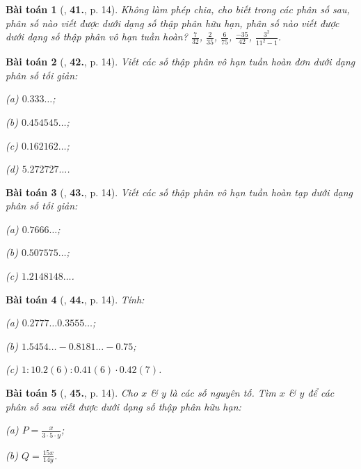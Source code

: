 \documentclass{article}
\numberwithin{equation}{section}
\newtheorem{baitoan}{Bài toán}[section]
\begin{document}
\begin{baitoan}[\cite{Tuyen_Toan_7}, \textbf{41.}, p. 14]
	Không làm phép chia, cho biết trong các phân số sau, phân số nào viết được dưới dạng số thập phân hữu hạn, phân số nào viết được dưới dạng số thập phân vô hạn tuần hoàn? $\frac{7}{32}$, $\frac{2}{35}$, $\frac{6}{75}$, $\frac{-35}{42}$, $\frac{3^2}{11^2 - 1}$.
\end{baitoan}

\begin{baitoan}[\cite{Tuyen_Toan_7}, \textbf{42.}, p. 14]
	Viết các số thập phân vô hạn tuần hoàn đơn dưới dạng phân số tối giản:
	\begin{enumerate*}
		\item[(a)] $0.333\ldots$;
		\item[(b)] $0.454545\ldots$;
		\item[(c)] $0.162162\ldots$;
		\item[(d)] $5.272727\ldots$.
	\end{enumerate*}
\end{baitoan}

\begin{baitoan}[\cite{Tuyen_Toan_7}, \textbf{43.}, p. 14]
	Viết các số thập phân vô hạn tuần hoàn tạp dưới dạng phân số tối giản:
	\begin{enumerate*}
		\item[(a)] $0.7666\ldots$;
		\item[(b)] $0.507575\ldots$;
		\item[(c)] $1.2148148\ldots$.
	\end{enumerate*}
\end{baitoan}

\begin{baitoan}[\cite{Tuyen_Toan_7}, \textbf{44.}, p. 14]
	Tính:\\
	\begin{enumerate*}
		\item[(a)] $0.2777\ldots 0.3555\ldots$;
		\item[(b)] $1.5454\ldots - 0.8181\ldots - 0.75$;
		\item[(c)] $1:10.2(6):0.41(6)\cdot 0.42(7)$.
	\end{enumerate*}
\end{baitoan}

\begin{baitoan}[\cite{Tuyen_Toan_7}, \textbf{45.}, p. 14]
	Cho $x$ \& $y$ là các số nguyên tố. Tìm $x$ \& $y$ để các phân số sau viết được dưới dạng số thập phân hữu hạn:
	\begin{enumerate*}
		\item[(a)] $P = \frac{x}{3\cdot 5\cdot y}$;
		\item[(b)] $Q = \frac{15x}{14y}$.
	\end{enumerate*}
\end{baitoan}
\end{document}
